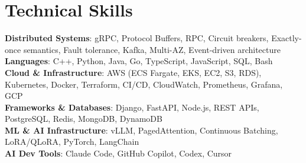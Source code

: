 \documentclass[letterpaper,11pt]{article}
\begin{document}
\section{Technical Skills}
\vspace{-7pt}
\begin{itemize}
[leftmargin=0.15in, label={}]\small{\item{
        \textbf{Distributed Systems}{: gRPC, Protocol Buffers, RPC, Circuit breakers, Exactly-once semantics, Fault tolerance, Kafka, Multi-AZ, Event-driven architecture} \\
        \textbf{Languages}{: C++, Python, Java, Go, TypeScript, JavaScript, SQL, Bash} \\
        \textbf{Cloud \& Infrastructure}{: AWS (ECS Fargate, EKS, EC2, S3, RDS), Kubernetes, Docker, Terraform, CI/CD, CloudWatch, Prometheus, Grafana, GCP} \\
        \textbf{Frameworks \& Databases}{: Django, FastAPI, Node.js, REST APIs, PostgreSQL, Redis, MongoDB, DynamoDB} \\
        \textbf{ML \& AI Infrastructure}{: vLLM, PagedAttention, Continuous Batching, LoRA/QLoRA, PyTorch, LangChain} \\
        \textbf{AI Dev Tools}{: Claude Code, GitHub Copilot, Codex, Cursor} \\
}}
\end{itemize}
\end{document}
